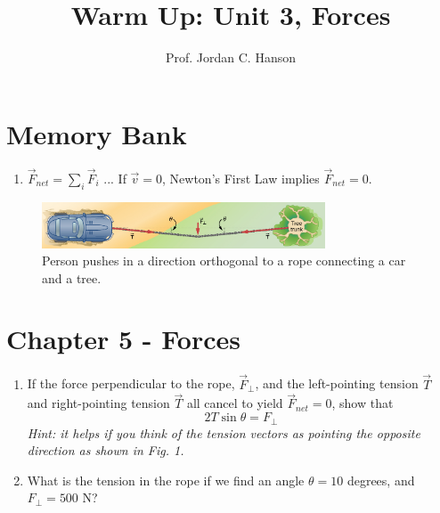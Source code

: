 \documentclass{article}
\begin{document}
\title{Warm Up: Unit 3, Forces}
\author{Prof. Jordan C. Hanson}

\maketitle

\section{Memory Bank}

\begin{enumerate}
\item $\vec{F}_{net} = \sum_i \vec{F}_i$ ... If $\vec{v} = 0$, Newton's First Law implies $\vec{F}_{net} = 0$.
\end{enumerate}

\begin{figure}[ht]
\centering
\includegraphics[width=0.75\textwidth]{rope.jpeg}
\caption{\label{fig:1} Person pushes in a direction orthogonal to a rope connecting a car and a tree.}
\end{figure}

\section{Chapter 5 - Forces}

\begin{enumerate}
\item If the force perpendicular to the rope, $\vec{F}_{\perp}$, and the left-pointing tension $\vec{T}$ and right-pointing tension $\vec{T}$ all cancel to yield $\vec{F}_{net} = 0$, show that
\begin{equation}
2T\sin\theta = F_{\perp}
\end{equation}
\textit{Hint: it helps if you think of the tension vectors as pointing the opposite direction as shown in Fig. 1.} \\ \vspace{3cm}
\item What is the tension in the rope if we find an angle $\theta = 10$ degrees, and $F_{\perp} = 500$ N?
\end{enumerate}
\end{document}
